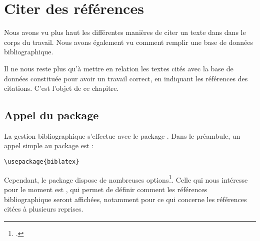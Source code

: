 \chapter{Citer des références}

\begin{prealable}
Nous avons vu plus haut les différentes manières de citer un texte dans  dans le corps du travail. Nous avons également vu comment remplir une base de données bibliographique.

Il ne nous reste plus qu'à mettre en relation les textes cités avec la base de données constituée pour avoir un travail correct, en indiquant les références des citations. C'est l'objet de ce chapitre.

\end{prealable}


\section[Appel du package]{Appel du package }

La gestion bibliographique s'effectue avec le package . Dans le préambule, un appel simple au package est :

\begin{verbatim}
\usepackage{biblatex}
\end{verbatim}

Cependant, le package dispose de nombreuses options\footcite{biblatex_options}. Celle qui nous intéresse pour le moment est , qui permet de définir comment les références bibliographique seront affichées, notamment pour ce qui concerne les références citées à plusieurs reprises.

